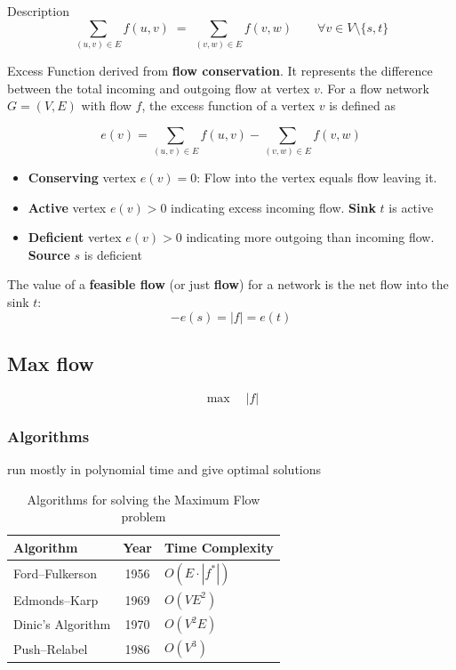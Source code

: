 \documentclass[12pt, openany]{article}
\begin{document}
\begin{definition}
Description
\[
    \sum_{(u,v)\in E} f(u,v)
    \;=\;
    \sum_{(v,w)\in E} f(v,w)
    \qquad \forall v \in V \setminus \{s,t\}
    \]
\end{definition}

\begin{definition}
Excess Function derived from \textbf{flow conservation}. It represents the difference between the total incoming and outgoing flow at vertex \(v\). For a flow network \(G = (V,E)\) with flow \(f\), the excess function of a vertex \(v\) is defined as

\[
e(v) =
\sum_{(u,v)\in E} f(u,v)
-
\sum_{(v,w)\in E} f(v,w)
\]
\end{definition}





\begin{itemize}

\item \textbf{Conserving} vertex \(e(v) = 0\): Flow into the vertex equals flow leaving it.
\item \textbf{Active} vertex \(e(v) > 0\) indicating excess incoming flow. \textbf{Sink} \(t\) is active
\item \textbf{Deficient} vertex \(e(v) > 0\) indicating more outgoing than incoming flow. \textbf{Source} \(s\) is deficient


\end{itemize}
The value of a \textbf{feasible flow} (or just \textbf{flow}) for a network is the net flow into the sink \(t\):
\[
-e(s) = |f| = e(t)
\]

\subsection{Max flow}
\[
\max \quad |f|
\]

\subsubsection{Algorithms} run mostly in polynomial time and give optimal solutions
\begin{table}[h]
\centering
\begin{tabular}{|l|c|l|}
\hline
\textbf{Algorithm} & \textbf{Year} & \textbf{Time Complexity} \\
\hline
Ford--Fulkerson & 1956 & $O(E \cdot |f^*|)$ \\
Edmonds--Karp & 1969 & $O(VE^2)$ \\
Dinic's Algorithm & 1970 & $O(V^2E)$ \\
Push--Relabel & 1986 & $O(V^3)$ \\
\hline
\end{tabular}
\caption{Algorithms for solving the Maximum Flow problem}
\end{table}
\end{document}
